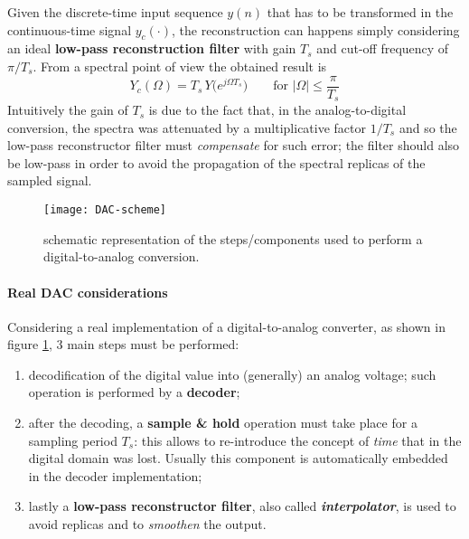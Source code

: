 	Given the discrete-time input sequence $y(n)$ that has to be transformed in the continuous-time signal $y_c(\cdot)$, the reconstruction can happens simply considering an ideal \textbf{low-pass reconstruction filter} with gain $T_s$ and cut-off frequency of $\pi/T_s$. From a spectral point of view the obtained result is
	\begin{equation}
		Y_c(\Omega) = T_s \, Y\big(e^{j\Omega T_s}\big) \qquad \textrm{for } |\Omega| \leq \frac \pi {T_s}
	\end{equation}
	Intuitively the gain of $T_s$ is due to the fact that, in the analog-to-digital conversion, the spectra was attenuated by a multiplicative factor $1/T_s$ and so the low-pass reconstructor filter must \textit{compensate} for such error; the filter should also be low-pass in order to avoid the propagation of the spectral replicas of the sampled signal.
	
	\begin{figure}[bht]
		\centering \texttt{[image: DAC-scheme]}
		\caption{schematic  representation of the steps/components used to perform a digital-to-analog conversion.} \label{fig:conv:DACscheme}
	\end{figure}
	
	\paragraph{Real DAC considerations} Considering a real implementation of a digital-to-analog converter, as shown in figure \ref{fig:conv:DACscheme}, 3 main steps must be performed:
	\begin{enumerate}
		\item decodification of the digital value into (generally) an analog voltage; such operation is performed by a \textbf{decoder};
		\item after the decoding, a \textbf{sample \& hold} operation must take place for a sampling period $T_s$: this allows to re-introduce the concept of \textit{time} that in the digital domain was lost. Usually this component is automatically embedded in the decoder implementation;
		\item lastly a \textbf{low-pass reconstructor filter}, also called \textbf{\textit{interpolator}}, is used to avoid replicas and to \textit{smoothen} the output.
	\end{enumerate}
	
